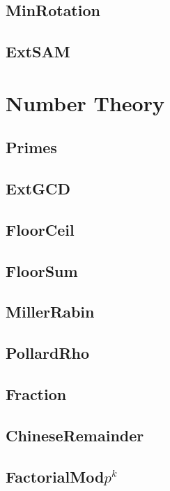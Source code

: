 \subsection{MinRotation}

\subsection{ExtSAM}

\section{Number Theory}
\subsection{Primes}

\subsection{ExtGCD}

\subsection{FloorCeil}

\subsection{FloorSum}


\subsection{MillerRabin}

\subsection{PollardRho}

\subsection{Fraction}

\subsection{ChineseRemainder}

\subsection{FactorialMod$p^k$}

